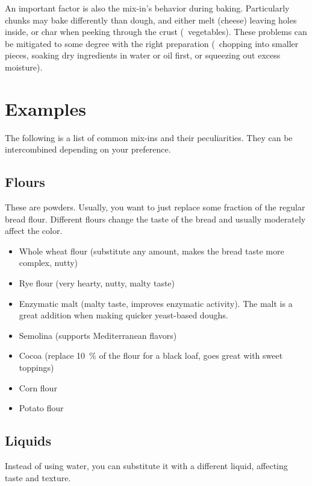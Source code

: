 An important factor is also the mix-in's behavior during baking. Particularly
chunks may bake differently than dough, and either melt (cheese) leaving holes
inside, or char when peeking through the crust (\eg~vegetables). These
problems can be mitigated to some degree with the right preparation (\eg~chopping
into smaller pieces, soaking dry ingredients in water or oil first,
or squeezing out excess moisture).

\section{Examples}

The following is a list of common mix-ins and their peculiarities. They can be
intercombined depending on your preference.

\subsection{Flours}
These are powders. Usually, you want to just replace some fraction of the
regular bread flour. Different flours change the taste of the bread and
usually moderately affect the color.
\begin{itemize}
  \item Whole wheat flour (substitute any amount, makes the bread taste more
      complex, nutty)
  \item Rye flour (very hearty, nutty, malty taste)
  \item Enzymatic malt (malty taste, improves enzymatic activity). The malt is
    a great addition when making quicker yeast-based doughs.
  \item Semolina (supports Mediterranean flavors)
  \item Cocoa (replace \qty{10}{\percent} of the flour for a black loaf, goes
      great with sweet toppings)
  \item Corn flour
  \item Potato flour
\end{itemize}

\subsection{Liquids}

Instead of using water, you can substitute it with a different liquid,
affecting taste and texture.

